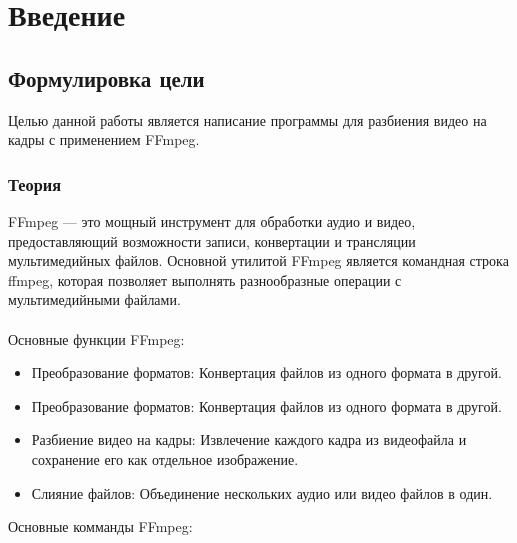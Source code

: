 \documentclass[12pt,a4paper]{scrartcl}
\begin{document}
\section{Введение}
\label{sec:intro}


\subsection{Формулировка цели}
Целью данной работы является написание программы для разбиения видео на кадры с применением FFmpeg.

\subsubsection{Теория}
FFmpeg — это мощный инструмент для обработки аудио и видео, предоставляющий возможности записи, конвертации и трансляции мультимедийных файлов. Основной утилитой FFmpeg является командная строка ffmpeg, которая позволяет выполнять разнообразные операции с мультимедийными файлами.\\
\\
Основные функции FFmpeg:
\begin{itemize}
    \item Преобразование форматов: Конвертация файлов из одного формата в другой.
    \item Преобразование форматов: Конвертация файлов из одного формата в другой.
    \item Разбиение видео на кадры: Извлечение каждого кадра из видеофайла и сохранение его как отдельное изображение.
    \item Слияние файлов: Объединение нескольких аудио или видео файлов в один.
\end{itemize} 
Основные комманды FFmpeg:
\end{document}
